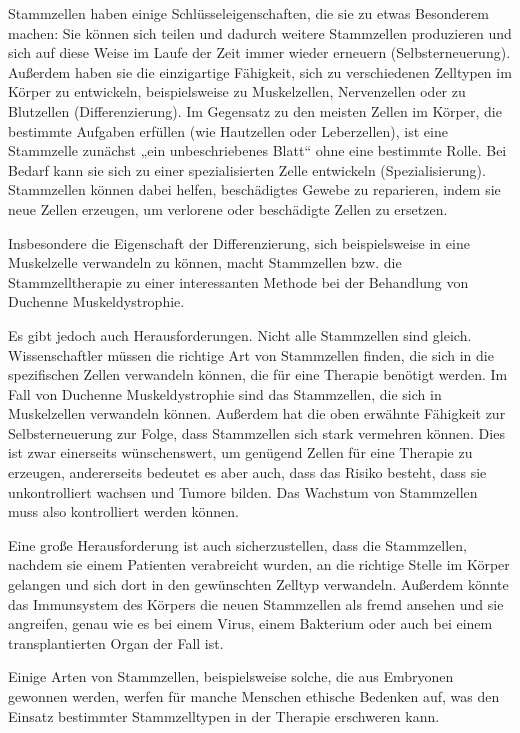 \documentclass[fontsize=14pt,a4paper,headinclude,DIV=calc,automark]{scrbook}
\begin{document}
Stammzellen haben einige Schlüsseleigenschaften, die sie zu etwas Besonderem machen: Sie können sich teilen und dadurch weitere Stammzellen produzieren und sich auf diese Weise im Laufe der Zeit immer wieder erneuern (Selbsterneuerung). Außerdem haben sie die einzigartige Fähigkeit, sich zu verschiedenen Zelltypen im Körper zu entwickeln, beispielsweise zu Muskelzellen, Nervenzellen oder zu Blutzellen (Differenzierung). Im Gegensatz zu den meisten Zellen im Körper, die bestimmte Aufgaben erfüllen (wie Hautzellen oder Leberzellen), ist eine Stammzelle zunächst „ein unbeschriebenes Blatt“ ohne eine bestimmte Rolle. Bei Bedarf kann sie sich zu einer spezialisierten Zelle entwickeln (Spezialisierung). Stammzellen können dabei helfen, beschädigtes Gewebe zu reparieren, indem sie neue Zellen erzeugen, um verlorene oder beschädigte Zellen zu ersetzen.

Insbesondere die Eigenschaft der Differenzierung, sich beispielsweise in eine Muskelzelle verwandeln zu können, macht Stammzellen bzw. die Stammzelltherapie zu einer interessanten Methode bei der Behandlung von Duchenne Muskeldystrophie.

Es gibt jedoch auch Herausforderungen. Nicht alle Stammzellen sind gleich. Wissenschaftler müssen die richtige Art von Stammzellen finden, die sich in die spezifischen Zellen verwandeln können, die für eine Therapie benötigt werden. Im Fall von Duchenne Muskeldystrophie sind das Stammzellen, die sich in Muskelzellen verwandeln können. Außerdem hat die oben erwähnte Fähigkeit zur Selbsterneuerung zur Folge, dass Stammzellen sich stark vermehren können. Dies ist zwar einerseits wünschenswert, um genügend Zellen für eine Therapie zu erzeugen, andererseits bedeutet es aber auch, dass das Risiko besteht, dass sie unkontrolliert wachsen und Tumore bilden. Das Wachstum von Stammzellen muss also kontrolliert werden können.

Eine große Herausforderung ist auch sicherzustellen, dass die Stammzellen, nachdem sie einem Patienten verabreicht wurden, an die richtige Stelle im Körper gelangen und sich dort in den gewünschten Zelltyp verwandeln. Außerdem könnte das Immunsystem des Körpers die neuen Stammzellen als fremd ansehen und sie angreifen, genau wie es bei einem Virus, einem Bakterium oder auch bei einem transplantierten Organ der Fall ist.

Einige Arten von Stammzellen, beispielsweise solche, die aus Embryonen gewonnen werden, werfen für manche Menschen ethische Bedenken auf, was den Einsatz bestimmter Stammzelltypen in der Therapie erschweren kann.
\end{document}
